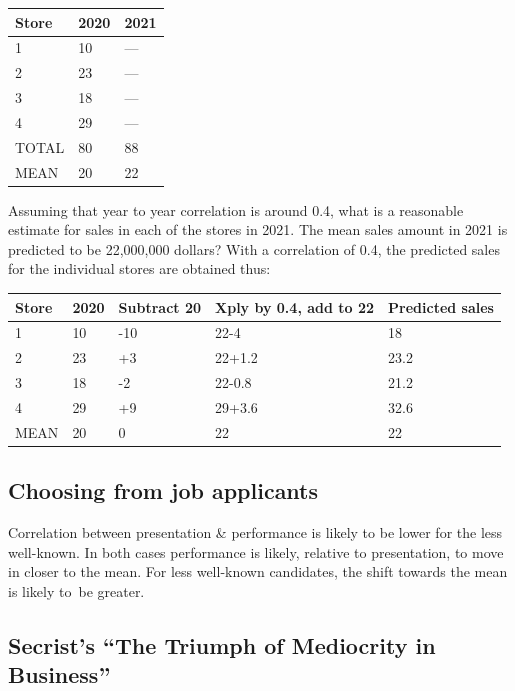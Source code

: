 \documentclass[
  10pt,
  b5paper]{book}
\begin{document}
\begin{longtable}[]{@{}lll@{}}
\toprule
Store & 2020 & 2021 \\
\midrule
\endhead
1 & 10 & --- \\
2 & 23 & --- \\
3 & 18 & --- \\
4 & 29 & --- \\
TOTAL & 80 & 88 \\
MEAN & 20 & 22 \\
\bottomrule
\end{longtable}

Assuming that year to year correlation is around 0.4,
what is a reasonable estimate for sales in each of the
stores in 2021. The mean sales amount in 2021 is predicted to be 22,000,000 dollars?
With a correlation of 0.4, the predicted sales for the individual stores are
obtained thus:

\begin{longtable}[]{@{}lllll@{}}
\toprule
Store & 2020 & Subtract 20 & Xply by 0.4, add to 22 & Predicted sales \\
\midrule
\endhead
1 & 10 & -10 & 22-4 & 18 \\
2 & 23 & +3 & 22+1.2 & 23.2 \\
3 & 18 & -2 & 22-0.8 & 21.2 \\
4 & 29 & +9 & 29+3.6 & 32.6 \\
MEAN & 20 & 0 & 22 & 22 \\
\bottomrule
\end{longtable}

\hypertarget{choosing-from-job-applicants}{%
\subsection*{Choosing from job applicants}\label{choosing-from-job-applicants}}

Correlation between presentation \& performance is likely to
be lower for the less well-known. In both cases performance
is likely, relative to presentation, to move in closer to the
mean. For less well-known candidates, the shift towards the
mean is likely to~be greater.

\hypertarget{secrists-the-triumph-of-mediocrity-in-business}{%
\subsection*{Secrist's ``The Triumph of Mediocrity in Business''}\label{secrists-the-triumph-of-mediocrity-in-business}}
\end{document}
